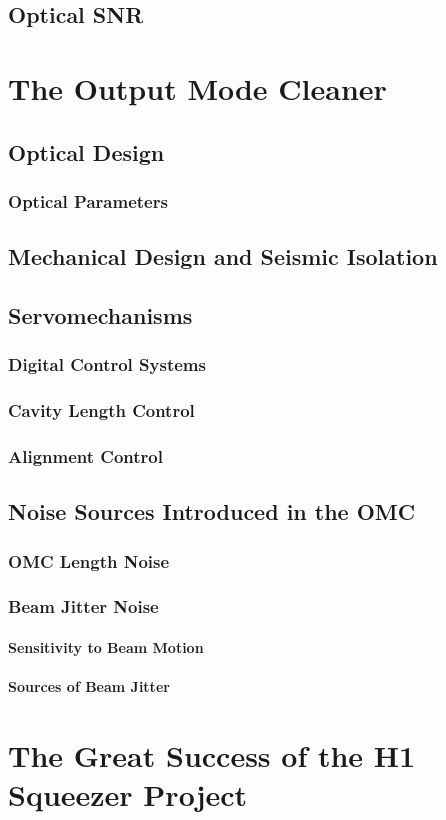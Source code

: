 \documentclass[12pt,vi,twoside]{mitthesis}
\begin{document}
\section{Optical SNR}

\chapter{The Output Mode Cleaner}
\section{Optical Design}
\subsection{Optical Parameters}
\section{Mechanical Design and Seismic Isolation}
\section{Servomechanisms}
\subsection{Digital Control Systems}
\subsection{Cavity Length Control}
\subsection{Alignment Control}
\section{Noise Sources Introduced in the OMC}
\subsection{OMC Length Noise}
\subsection{Beam Jitter Noise}
\subsubsection{Sensitivity to Beam Motion}
\subsubsection{Sources of Beam Jitter}

\chapter{The Great Success of the H1 Squeezer Project}

\appendix



\end{document}
